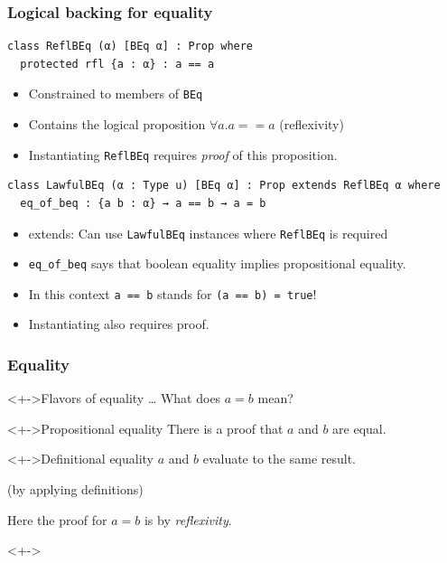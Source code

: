 \documentclass{beamer}
\begin{document}
\begin{frame}[fragile]
  \frametitle{Logical backing for equality}
\begin{lstlisting}
class ReflBEq (α) [BEq α] : Prop where
  protected rfl {a : α} : a == a
\end{lstlisting}

  \begin{itemize}
  \item Constrained to members of \lstinline{BEq}
  \item Contains the logical proposition $\forall a. a == a$ (reflexivity)
  \item Instantiating \lstinline{ReflBEq} requires \emph{proof} of this proposition.
  \end{itemize}
  
\begin{lstlisting}
class LawfulBEq (α : Type u) [BEq α] : Prop extends ReflBEq α where
  eq_of_beq : {a b : α} → a == b → a = b
\end{lstlisting}
  \begin{itemize}
  \item extends: Can use \lstinline{LawfulBEq} instances where
    \lstinline{ReflBEq} is required
  \item \lstinline{eq_of_beq} says that boolean equality implies propositional
    equality.
  \item In this context \lstinline{a == b} stands for \lstinline{(a == b) = true}!
  \item Instantiating also requires proof.
  \end{itemize}
  
\end{frame}
\begin{frame}
  \frametitle{Equality}
  \begin{block}<+->{Flavors of equality \dots}
    What does $a = b$ mean?
  \end{block}
  \begin{block}<+->{Propositional equality}
    There is a proof that $a$ and $b$ are equal.
  \end{block}
  \begin{block}<+->{Definitional equality}
    $a$ and $b$ evaluate to the same result.

    (by applying definitions)

    Here the proof for $a = b$ is by \emph{reflexivity}.
  \end{block}
  \begin{block}<+->{}
  \end{block}
\end{frame}
\end{document}

